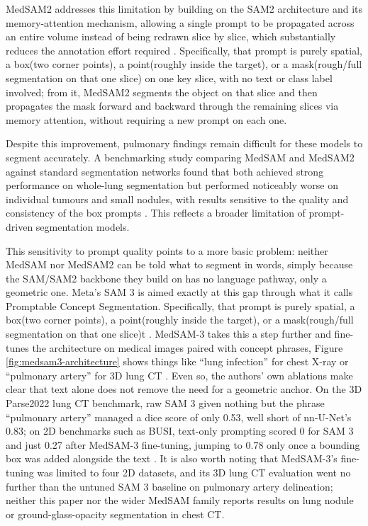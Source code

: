 MedSAM2 addresses this limitation by building on the SAM2 architecture and its memory-attention mechanism, 
allowing a single prompt to be propagated across an entire volume instead of being redrawn slice by slice, 
which substantially reduces the annotation effort required \cite{ravi2025medsam2}. Specifically, that prompt is purely spatial, a box(two corner points), 
a point(roughly inside the target), or a mask(rough/full segmentation on that one slice) on one
key slice, with no text or class label involved; from it, MedSAM2 segments the object on that slice and
then propagates the mask forward and backward through the remaining slices via memory attention, without
requiring a new prompt on each one.

Despite this improvement, pulmonary findings remain difficult for these models to segment accurately.
A benchmarking study comparing MedSAM and MedSAM2 against standard segmentation networks 
found that both achieved strong performance on whole-lung segmentation but 
performed noticeably worse on individual tumours and small nodules, 
with results sensitive to the quality and consistency of the box prompts \cite{ayllon2025benchmarking}.
This reflects a broader limitation of prompt-driven segmentation models.

This sensitivity to prompt quality points to a more basic problem: neither MedSAM nor MedSAM2 can be told
what to segment in words, simply because the SAM/SAM2 backbone they build on has no language
pathway, only a geometric one. Meta's SAM 3 is aimed exactly at this gap through what it calls
Promptable Concept Segmentation. Specifically, that prompt is purely spatial, 
a box(two corner points), a point(roughly inside the target), or a mask(rough/full segmentation on that one slice)t \cite{meta2025sam3}. 
MedSAM-3 takes this a step further and fine-tunes the architecture on
medical images paired with concept phrases, Figure \ref{fig:medsam3-architecture} shows things like ``lung infection'' for chest X-ray or ``pulmonary
artery'' for 3D lung CT \cite{liu2025medsam3}. Even so, the authors' own ablations make clear that text
alone does not remove the need for a geometric anchor. On the 3D Parse2022 lung CT benchmark, raw SAM 3
given nothing but the phrase ``pulmonary artery'' managed a dice score of only 0.53, well short of nn-U-Net's
0.83; on 2D benchmarks such as BUSI, text-only prompting scored 0 for SAM 3 and just 0.27 after MedSAM-3
fine-tuning, jumping to 0.78 only once a bounding box was added alongside the text \cite{liu2025medsam3}.
It is also worth noting that MedSAM-3's fine-tuning was limited to four 2D datasets, and its 3D lung CT
evaluation went no further than the untuned SAM 3 baseline on pulmonary artery delineation; neither this
paper nor the wider MedSAM family reports results on lung nodule or ground-glass-opacity segmentation in
chest CT.

